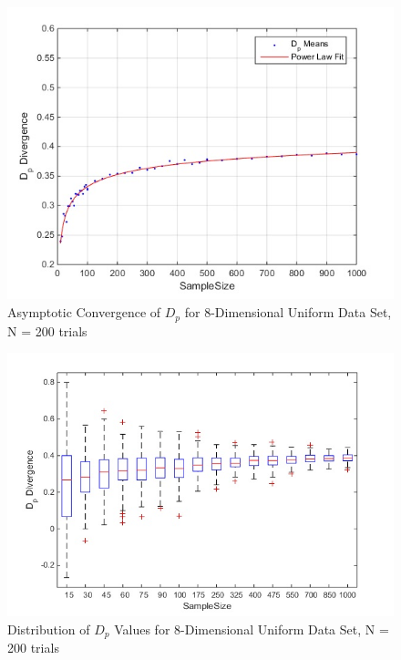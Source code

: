 \documentclass{article}
\begin{document}
	\begin{figure}[h!]
		\caption{Asymptotic Convergence of $D_p$ for 8-Dimensional Uniform Data Set, N = 200 trials}
		\centering
		\includegraphics[scale=0.6]{dp_n200_uniform}
	\end{figure}	
	
	\begin{figure}[h!]
		\caption{Distribution of $D_p$ Values for 8-Dimensional Uniform Data Set, N = 200 trials}
		\centering
		\includegraphics[scale=0.6]{dp_n200_uniform_bars}
	\end{figure}	
\newpage
\end{document}
